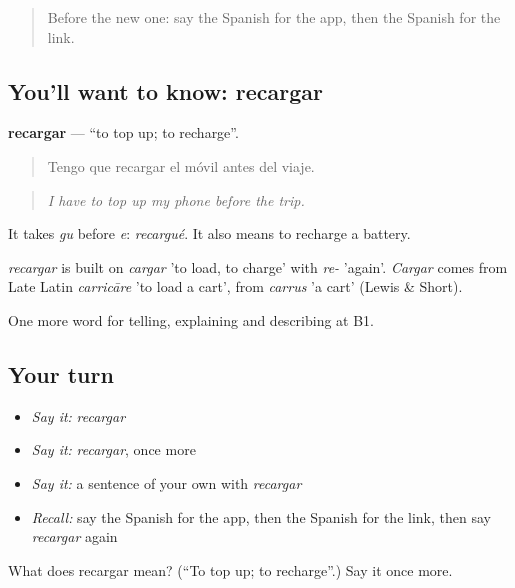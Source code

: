 \label{lesson:ES-C773-recargar}



\begin{quote}
Before the new one: say the Spanish for the app, then the Spanish for the link.
\end{quote}

\subsection*{You'll want to know: recargar}
\textbf{recargar} — \textquotedblleft{}to top up; to recharge\textquotedblright{}.

\begin{quote}
Tengo que recargar el móvil antes del viaje.
\end{quote}

\begin{quote}
\emph{I have to top up my phone before the trip.}
\end{quote}

It takes \emph{gu} before \emph{e}: \emph{recargué}. It also means to recharge a battery.

\begin{cousinweb}
\emph{recargar} is built on \emph{cargar} 'to load, to charge' with \emph{re-} 'again'. \emph{Cargar} comes from Late Latin \emph{carricāre} 'to load a cart', from \emph{carrus} 'a cart' (Lewis \& Short).
\end{cousinweb}

\begin{grammarlens}[title={What you've built}]
One more word for telling, explaining and describing at B1.
\end{grammarlens}

\subsection*{Your turn}
\begin{itemize}
\raggedright
  \item \emph{Say it:} \emph{recargar}
  \item \emph{Say it:} \emph{recargar}, once more
  \item \emph{Say it:} a sentence of your own with \emph{recargar}
  \item \emph{Recall:} say the Spanish for the app, then the Spanish for the link, then say \emph{recargar} again
\end{itemize}

\begin{tcolorbox}[breakable,colback=teal!4,colframe=teal!35!black,title={Before you move on}]
What does recargar mean? (\textquotedblleft{}To top up; to recharge\textquotedblright{}.) Say it once more.
\end{tcolorbox}
